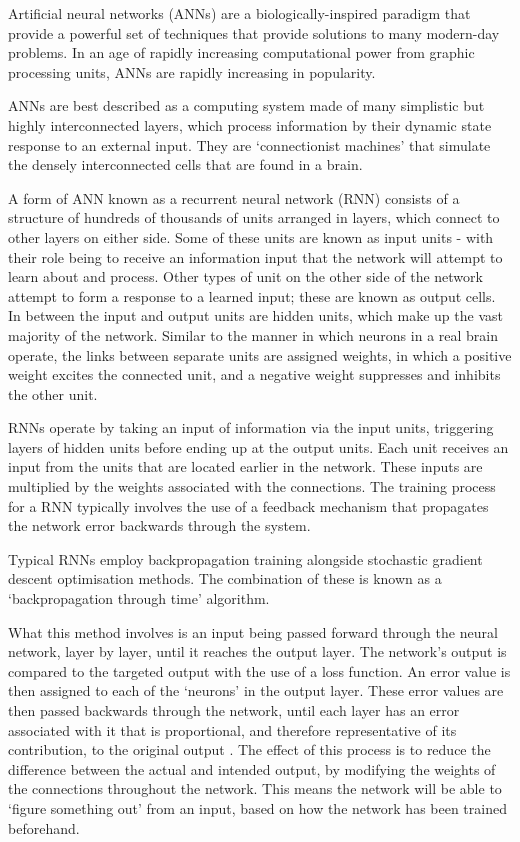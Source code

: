 Artificial neural networks (ANNs) are a biologically-inspired paradigm that provide a powerful set of techniques that provide solutions to many modern-day problems. In an age of rapidly increasing computational power from graphic processing units, ANNs are rapidly increasing in popularity.

ANNs are best described as a computing system made of many simplistic but highly interconnected layers, which process information by their dynamic state response to an external input. They are `connectionist machines' that simulate the densely interconnected cells that are found in a brain.

A form of ANN known as a recurrent neural network (RNN) consists of a structure of hundreds of thousands of units arranged in layers, which connect to other layers on either side. Some of these units are known as input units - with their role being to receive an information input that the network will attempt to learn about and process. Other types of unit on the other side of the network attempt to form a response to a learned input; these are known as output cells. In between the input and output units are hidden units, which make up the vast majority of the network. Similar to the manner in which neurons in a real brain operate, the links between separate units are assigned weights, in which a positive weight excites the connected unit, and a negative weight suppresses and inhibits the other unit.

RNNs operate by taking an input of information via the input units, triggering layers of hidden units before ending up at the output units. Each unit receives an input from the units that are located earlier in the network. These inputs are multiplied by the weights associated with the connections. The training process for a RNN typically involves the use of a feedback mechanism that propagates the network error backwards through the system.


Typical RNNs employ backpropagation training alongside stochastic gradient descent optimisation methods. The combination of these is known as a `backpropagation through time' algorithm. 

What this method involves is an input being passed forward through the neural network, layer by layer, until it reaches the output layer. The network's output is compared to the targeted output with the use of a loss function. An error value is then assigned to each of the `neurons' in the output layer. These error values are then passed backwards through the network, until each layer has an error associated with it that is proportional, and therefore representative of its contribution, to the original output \cite{Graves2012}. The effect of this process is to reduce the difference between the actual and intended output, by modifying the weights of the connections throughout the network. This means the network will be able to `figure something out' from an input, based on how the network has been trained beforehand.

